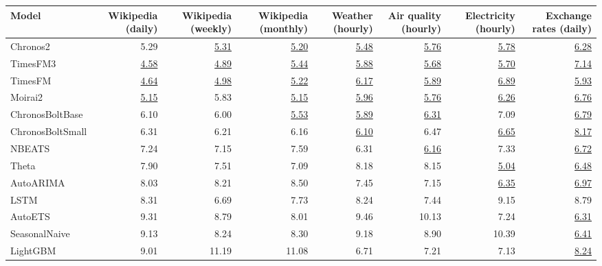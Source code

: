 \begin{tabular}{lrrrrrrr}
\toprule
Model & Wikipedia (daily) & Wikipedia (weekly) & Wikipedia (monthly) & Weather (hourly) & Air quality (hourly) & Electricity (hourly) & Exchange rates (daily) \\
\midrule
Chronos2 & 5.29 & \underline{5.31} & \underline{5.20} & \underline{5.48} & \underline{5.76} & \underline{5.78} & \underline{6.28} \\
TimesFM3 & \underline{4.58} & \underline{4.89} & \underline{5.44} & \underline{5.88} & \underline{5.68} & \underline{5.70} & \underline{7.14} \\
TimesFM & \underline{4.64} & \underline{4.98} & \underline{5.22} & \underline{6.17} & \underline{5.89} & \underline{6.89} & \underline{5.93} \\
Moirai2 & \underline{5.15} & 5.83 & \underline{5.15} & \underline{5.96} & \underline{5.76} & \underline{6.26} & \underline{6.76} \\
ChronosBoltBase & 6.10 & 6.00 & \underline{5.53} & \underline{5.89} & \underline{6.31} & 7.09 & \underline{6.79} \\
ChronosBoltSmall & 6.31 & 6.21 & 6.16 & \underline{6.10} & 6.47 & \underline{6.65} & \underline{8.17} \\
NBEATS & 7.24 & 7.15 & 7.59 & 6.31 & \underline{6.16} & 7.33 & \underline{6.72} \\
Theta & 7.90 & 7.51 & 7.09 & 8.18 & 8.15 & \underline{5.04} & \underline{6.48} \\
AutoARIMA & 8.03 & 8.21 & 8.50 & 7.45 & 7.15 & \underline{6.35} & \underline{6.97} \\
LSTM & 8.31 & 6.69 & 7.73 & 8.24 & 7.44 & 9.15 & 8.79 \\
AutoETS & 9.31 & 8.79 & 8.01 & 9.46 & 10.13 & 7.24 & \underline{6.31} \\
SeasonalNaive & 9.13 & 8.24 & 8.30 & 9.18 & 8.90 & 10.39 & \underline{6.41} \\
LightGBM & 9.01 & 11.19 & 11.08 & 6.71 & 7.21 & 7.13 & \underline{8.24} \\
\bottomrule
\end{tabular}
